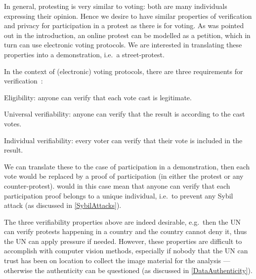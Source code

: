 In general, protesting is very similar to voting: both are many individuals 
expressing their opinion.
Hence we desire to have similar properties of verification and privacy for 
participation in a protest as there is for voting.
As was pointed out in the introduction, an online protest can be modelled as 
a petition, which in turn can use electronic voting protocols.
We are interested in translating these properties into a demonstration, i.e.\ 
a street-protest.

In the context of (electronic) voting protocols, there are three requirements 
for verification~\cite{VerifyingPrivacyPropertiesOfVotingProtocols}:
\begin{requirements}[V]
\item\label{EligibilityVerif} Eligibility: anyone can verify that each vote 
  cast is legitimate.
\item\label{UniversalVerif} Universal verifiability: anyone can verify that the 
  result is according to the cast votes.
\item\label{IndividualVerif} Individual verifiability: every voter can verify 
  that their vote is included in the result.
\end{requirements}
We can translate these to the case of participation in a demonstration, then 
each vote would be replaced by a proof of participation (in either the protest 
or any counter-protest).
 would in this case mean that anyone can verify that 
each participation proof belongs to a unique individual, i.e.\ to prevent any 
Sybil attack (as discussed in \cref{SybilAttacks}).

The three verifiability properties above are indeed desirable, e.g.\ then the 
\ac{UN} can verify protests happening in a country and the country cannot deny 
it, thus the \ac{UN} can apply pressure if needed.
However, these properties are difficult to accomplish with computer vision 
methods, especially if nobody that the \ac{UN} can trust has been on location 
to collect the image material for the analysis --- otherwise the authenticity 
can be questioned (as discussed in \cref{DataAuthenticity}).

